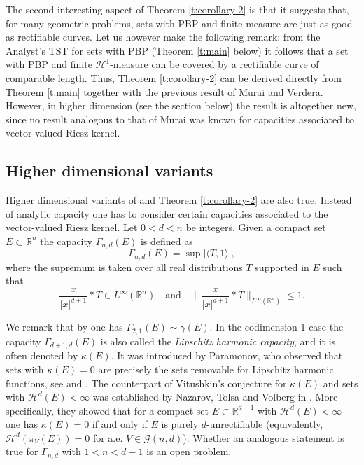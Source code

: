 \documentclass[11pt,reqno]{amsart}
\newcommand{\fr}[2]{\frac{#1}{#2}}
\theoremstyle{definition}
\theoremstyle{remark}
\numberwithin{equation}{section}
\newcommand{\R}{\mathbb{R}}
\newcommand{\dH}{\mathcal{H}}
\theoremstyle{theorem}
\theoremstyle{definition}
\theoremstyle{remark}
\numberwithin{equation}{section}
\begin{document}
The second interesting aspect of Theorem \ref{t:corollary-2} is that it suggests that, for many geometric problems, sets with PBP and finite measure are just as good as rectifiable curves. 
Let us however make the following remark: from the Analyst's TST for sets with PBP (Theorem \ref{t:main} below) it follows that a set with PBP and finite $\dH^1$-measure can be covered by a rectifiable curve of comparable length. Thus, Theorem \ref{t:corollary-2} can be derived directly from Theorem \ref{t:main} together with the previous result of Murai and Verdera. However, in higher dimension (see the section below) the result is altogether new, since no result analogous to that of Murai was known for capacities associated to vector-valued Riesz kernel.


\subsection{Higher dimensional variants}

	Higher dimensional variants of  and Theorem \ref{t:corollary-2} are also true. Instead of analytic capacity one has to consider certain capacities associated to the vector-valued Riesz kernel. Let $0<d<n$ be integers. Given a compact set $E\subset\R^n$ the capacity $\Gamma_{n,d}(E)$ is defined as
	\begin{equation*}
		\Gamma_{n,d}(E) = \sup |\langle T, 1\rangle |,
	\end{equation*}
	where the supremum is taken over all real distributions $T$ supported in $E$ such that 
	\begin{equation*}
		\fr{x}{|x|^{d+1}}\ast T\in L^{\infty}(\R^n)\quad\text{and}\quad \bigg\| \fr{x}{|x|^{d+1}}\ast T\bigg\|_{L^{\infty}(\R^n)}\le 1.
	\end{equation*}
	
	We remark that by \cite{tolsa2003painleve} one has $\Gamma_{2,1}(E)\sim\gamma(E)$. In the codimension 1 case the capacity $\Gamma_{d+1,d}(E)$ is also called the \emph{Lipschitz harmonic capacity}, and it is often denoted by $\kappa(E)$. It was introduced by Paramonov, who observed that sets with $\kappa(E)=0$ are precisely the sets removable for Lipschitz harmonic functions, see \cite[Remark 2.4]{paramonov1990harmonic} and \cite{mattila1995geometric}. The counterpart of Vitushkin's conjecture for $\kappa(E)$ and sets with $\dH^d(E)<\infty$ was established by Nazarov, Tolsa and Volberg in \cite{nazarov2014,nazarov2014on}. More specifically, they showed that for a compact set $E\subset\R^{d+1}$ with $\dH^d(E)<\infty$ one has $\kappa(E)=0$ if and only if $E$ is purely $d$-unrectifiable (equivalently, $\dH^d(\pi_V(E))=0$ for a.e. $V\in\mathcal{G}(n,d)$). Whether an analogous statement is true for $\Gamma_{n,d}$ with $1<n<d-1$ is an open problem.
\end{document}
